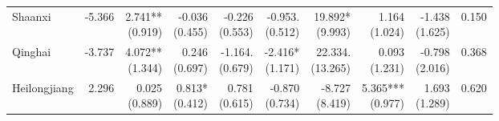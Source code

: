 \documentclass[12pt]{article}
\begin{document}
\begin{landscape}
\begin{small}
\begin{longtable}{lrrrrrrrrr}
    Shaanxi & -5.366 & \makecell[r]{2.741**\\(0.919)} & \makecell[r]{-0.036\\(0.455)} & \makecell[r]{-0.226\\(0.553)} & \makecell[r]{-0.953.\\(0.512)} & \makecell[r]{19.892*\\(9.993)} & \makecell[r]{1.164\\(1.024)} & \makecell[r]{-1.438\\(1.625)} & 0.150 \\
    Qinghai & -3.737 & \makecell[r]{4.072**\\(1.344)} & \makecell[r]{0.246\\(0.697)} & \makecell[r]{-1.164.\\(0.679)} & \makecell[r]{-2.416*\\(1.171)} & \makecell[r]{22.334.\\(13.265)} & \makecell[r]{0.093\\(1.231)} & \makecell[r]{-0.798\\(2.016)} & 0.368 \\
    Heilongjiang & 2.296 & \makecell[r]{0.025\\(0.889)} & \makecell[r]{0.813*\\(0.412)} & \makecell[r]{0.781\\(0.615)} & \makecell[r]{-0.870\\(0.734)} & \makecell[r]{-8.727\\(8.419)} & \makecell[r]{5.365***\\(0.977)} & \makecell[r]{1.693\\(1.289)} & 0.620 \\
  \end{longtable}


\end{small}
\end{landscape}
\end{document}
